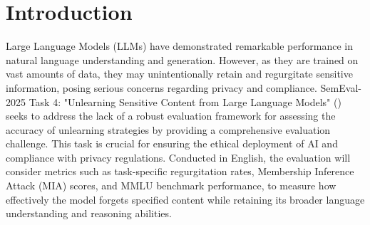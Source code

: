 \documentclass[11pt]{article}
\begin{document}
\section{Introduction}
\iffalse



Large Language Models (LLMs) have demonstrated remarkable performance in natural language understanding and generation. However, as they are trained on vast amounts of data, they may unintentionally retain and regurgitate sensitive information, posing serious concerns regarding privacy and compliance. 
SemEval-2025 Task 4: "Unlearning Sensitive Content from Large Language Models"
(\citep{ramakrishna2025lumellmunlearningmultitask})
seeks to address the lack of a robust evaluation framework for assessing the accuracy of unlearning strategies by providing a comprehensive evaluation challenge. 
This task is crucial for ensuring the ethical deployment of AI and compliance with privacy regulations.
Conducted in English, the evaluation will consider metrics such as task-specific regurgitation rates, Membership Inference Attack (MIA) scores, and MMLU benchmark performance, to measure how effectively the model forgets specified content while retaining its broader language understanding and reasoning abilities.\par

\end{document}
